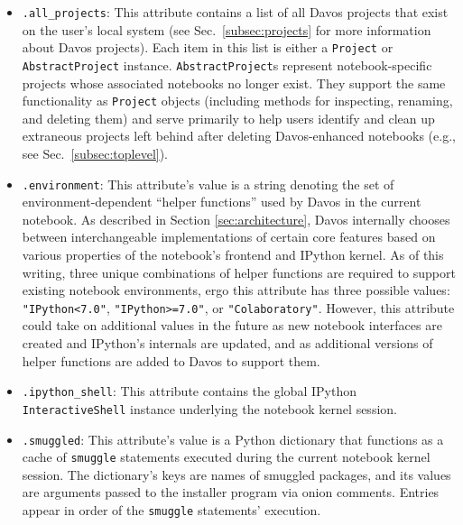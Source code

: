 \documentclass[preprint,12pt,a4paper]{elsarticle}
\begin{document}
\begin{itemize}

\item \texttt{.all\_projects}: This attribute contains a list of all Davos projects that exist on the user's local system (see Sec.~\ref{subsec:projects} for more information about Davos projects).
  Each item in this list is either a \texttt{Project} or \texttt{AbstractProject} instance.
  \texttt{AbstractProject}s represent notebook-specific projects whose associated notebooks no longer exist.
  They support the same functionality as \texttt{Project} objects (including methods for inspecting, renaming, and deleting them) and serve primarily to help users identify and clean up extraneous projects left behind after deleting Davos-enhanced notebooks (e.g., see Sec.~\ref{subsec:toplevel}).

\item \texttt{.environment}: This attribute's value is a string denoting the set of environment-dependent ``helper functions'' used by Davos in the current notebook.
  As described in Section \ref{sec:architecture}, Davos internally chooses between interchangeable implementations of certain core features based on various properties of the notebook's frontend and IPython kernel.
  As of this writing, three unique combinations of helper functions are required to support existing notebook environments, ergo this attribute has three possible values: \texttt{"IPython<7.0"}, \texttt{"IPython>=7.0"}, or \texttt{"Colaboratory"}.
  However, this attribute could take on additional values in the future as new notebook interfaces are created and IPython's internals are updated, and as additional versions of helper functions are added to Davos to support them.

\item \texttt{.ipython\_shell}: This attribute contains the global IPython \texttt{InteractiveShell} instance underlying the notebook kernel session.

\item \texttt{.smuggled}: This attribute's value is a Python dictionary that functions as a cache of \texttt{smuggle} statements executed during the current notebook kernel session.
  The dictionary's keys are names of smuggled packages, and its values are arguments passed to the installer program via onion comments.
  Entries appear in order of the \texttt{smuggle} statements' execution.

\end{itemize}
\end{document}
